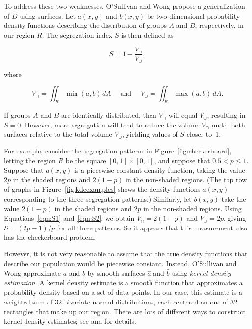 \documentclass{article}
\theoremstyle{theorem}
\theoremstyle{definition}
\begin{document}
To address these two weaknesses, O'Sullivan and Wong \cite{sullivanwong07} propose a generalization of $D$ using surfaces. Let $a(x,y)$ and $b(x,y)$ be two-dimensional probability density functions describing the distribution of groups $A$ and $B$, respectively, in our region $R$. The segregation index $S$ is then defined as

\begin{equation}\label{eqn:S1}
  S = 1 - \frac{V_\cap}{V_\cup},
\end{equation}

where

\begin{equation}\label{eqn:S2}
  V_\cap = \iint_R \min(a, b) \, dA \quad \text{ and } \quad V_\cup = \iint_R \max(a,b) \, dA.
\end{equation}

If groups $A$ and $B$ are identically distributed, then $V_\cap$ will equal $V_\cup$, resulting in $S = 0$. However, more segregation will tend to reduce the volume $V_\cap$ under both surfaces relative to the total volume $V_\cup$, yielding values of $S$ closer to~1.

For example, consider the segregation patterns in Figure~\ref{fig:checkerboard}, letting the region $R$ be the square $[0,1] \times [0,1]$, and suppose that $0.5 < p \leq 1$. Suppose that $a(x,y)$ is a piecewise constant density function, taking the value $2p$ in the shaded regions and $2(1-p)$ in the non-shaded regions. (The top row of graphs in Figure~\ref{fig:kdeexamples} shows the density functions $a(x,y)$ corresponding to the three segregation patterns.) Similarly, let $b(x,y)$ take the value $2(1-p)$ in the shaded regions and $2p$ in the non-shaded regions. Using Equations~\ref{eqn:S1} and~\ref{eqn:S2}, we obtain $V_\cap = 2(1-p)$ and $V_\cup = 2p$, giving $S = (2p-1)/p$ for all three patterns. So it appears that this measurement also has the checkerboard problem.

However, it is not very reasonable to assume that the true density functions that describe our population would be piecewise constant. Instead, O'Sullivan and Wong approximate $a$ and $b$ by smooth surfaces $\hat{a}$ and $\hat{b}$ using \textit{kernel density estimation}. A kernel density estimate is a smooth function that approximates a probability density based on a set of data points. \cite{wandjones11} In our case, this estimate is a weighted sum of 32 bivariate normal distributions, each centered on one of 32 rectangles that make up our region. There are lots of different ways to construct kernel density estimates; see \cite{wandjones11} and \cite{dengwickham11} for details.
\end{document}
